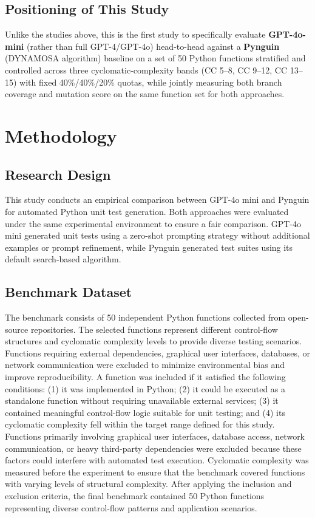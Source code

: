 \documentclass[conference]{IEEEtran}
\begin{document}
\subsection{Positioning of This Study}
\label{subsec:related-positioning}
Unlike the studies above, this is the first study to specifically evaluate \textbf{GPT-4o-mini} (rather than full GPT-4/GPT-4o) head-to-head against a \textbf{Pynguin} (DYNAMOSA algorithm) baseline on a set of 50 Python functions stratified and controlled across three cyclomatic-complexity bands (CC 5--8, CC 9--12, CC 13--15) with fixed 40\%/40\%/20\% quotas, while jointly measuring both branch coverage and mutation score on the same function set for both approaches.
\section{Methodology}
\subsection{Research Design}\label{AA}
This study conducts an empirical comparison between GPT-4o mini \cite{b9} and Pynguin \cite{b8} for automated Python unit test generation. Both approaches were evaluated under the same experimental environment to ensure a fair comparison. GPT-4o mini generated unit tests using a zero-shot prompting strategy without additional examples or prompt refinement, while Pynguin generated test suites using its default search-based algorithm.
\subsection{Benchmark Dataset}
The benchmark consists of 50 independent Python functions collected from open-source repositories. The selected functions represent different control-flow structures and cyclomatic complexity levels to provide diverse testing scenarios. Functions requiring external dependencies, graphical user interfaces, databases, or network communication were excluded to minimize environmental bias and improve reproducibility.
A function was included if it satisfied the following conditions: (1) it was implemented in Python; (2) it could be executed as a standalone function without requiring unavailable external services; (3) it contained meaningful control-flow logic suitable for unit testing; and (4) its cyclomatic complexity fell within the target range defined for this study. Functions primarily involving graphical user interfaces, database access, network communication, or heavy third-party dependencies were excluded because these factors could interfere with automated test execution.
Cyclomatic complexity was measured before the experiment to ensure that the benchmark covered functions with varying levels of structural complexity. After applying the inclusion and exclusion criteria, the final benchmark contained 50 Python functions representing diverse control-flow patterns and application scenarios.
\end{document}
